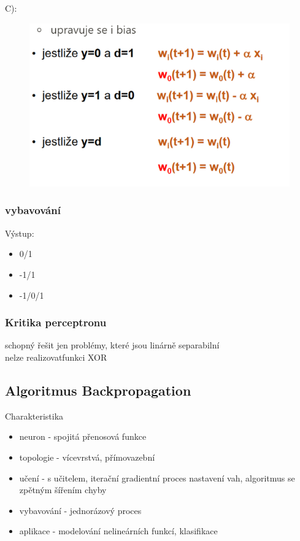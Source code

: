 C):
\begin{figure}[H]
    \includegraphics[scale = 0.7]{images/perceptron_vahy3.png}
\end{figure}

\subsubsection{vybavování}
Výstup:
\begin{itemize}
    \item 0/1
    \item -1/1
    \item -1/0/1
\end{itemize}
\subsubsection*{Kritika perceptronu}
schopný řešit jen problémy, které jsou linárně separabilní\\
nelze realizovatfunkci XOR

\subsection{Algoritmus Backpropagation}
Charakteristika
\begin{itemize}
    \item neuron - spojitá přenosová funkce
    \item topologie - vícevrstvá, přímovazební
    \item učení - s učitelem, iterační gradientní proces nastavení vah, algoritmus se zpětným šířením chyby
    \item vybavování - jednorázový proces
    \item aplikace - modelování nelineárních funkcí, klasifikace
\end{itemize}

